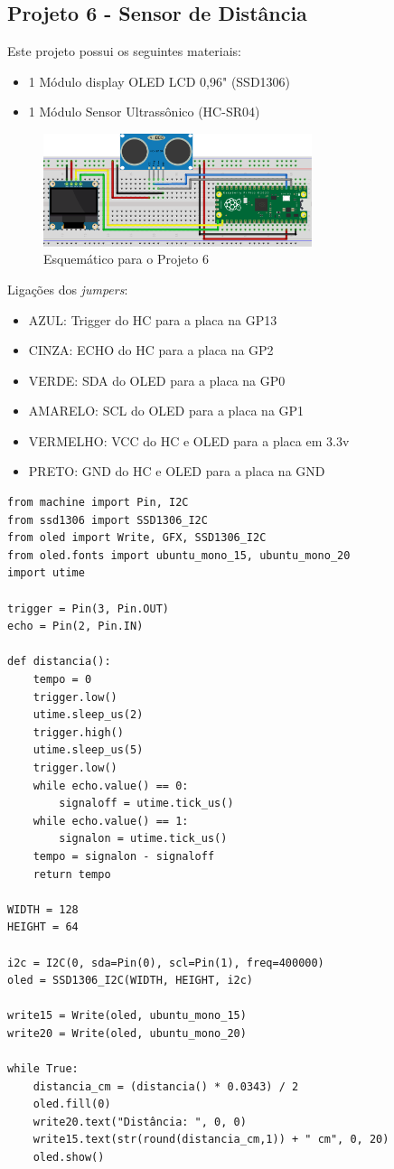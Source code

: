 \documentclass[a4paper,11pt]{article}
\begin{document}
\subsection{Projeto 6 - Sensor de Distância}

Este projeto possui os seguintes materiais: \vspace{-1em}
\begin{itemize}
	\item 1 Módulo display OLED LCD 0,96" (SSD1306)
	\item 1 Módulo Sensor Ultrassônico (HC-SR04)
\end{itemize}

\begin{figure}[H]
	\centering
	\includegraphics[width=0.7\textwidth]{imagem/PicoProj6}
	\caption{Esquemático para o Projeto 6}
\end{figure}

Ligações dos \textit{jumpers}: \vspace{-1em}
\begin{itemize}
	\item AZUL: Trigger do HC para a placa na GP13
	\item CINZA: ECHO do HC para a placa na GP2
	\item VERDE: SDA do OLED para a placa na GP0
	\item AMARELO: SCL do OLED para a placa na GP1
	\item VERMELHO: VCC do HC e OLED para a placa em 3.3v
	\item PRETO: GND do HC e OLED para a placa na GND
\end{itemize}

\begin{lstlisting}
from machine import Pin, I2C
from ssd1306 import SSD1306_I2C
from oled import Write, GFX, SSD1306_I2C
from oled.fonts import ubuntu_mono_15, ubuntu_mono_20
import utime

trigger = Pin(3, Pin.OUT)
echo = Pin(2, Pin.IN)

def distancia():
	tempo = 0
	trigger.low()
	utime.sleep_us(2)
	trigger.high()
	utime.sleep_us(5)
	trigger.low()
	while echo.value() == 0:
		signaloff = utime.tick_us()
	while echo.value() == 1:
		signalon = utime.tick_us()
	tempo = signalon - signaloff
	return tempo

WIDTH = 128
HEIGHT = 64

i2c = I2C(0, sda=Pin(0), scl=Pin(1), freq=400000)
oled = SSD1306_I2C(WIDTH, HEIGHT, i2c)

write15 = Write(oled, ubuntu_mono_15)
write20 = Write(oled, ubuntu_mono_20)

while True:
	distancia_cm = (distancia() * 0.0343) / 2
	oled.fill(0)
	write20.text("Distância: ", 0, 0)
	write15.text(str(round(distancia_cm,1)) + " cm", 0, 20)
	oled.show()
\end{lstlisting}
\end{document}
